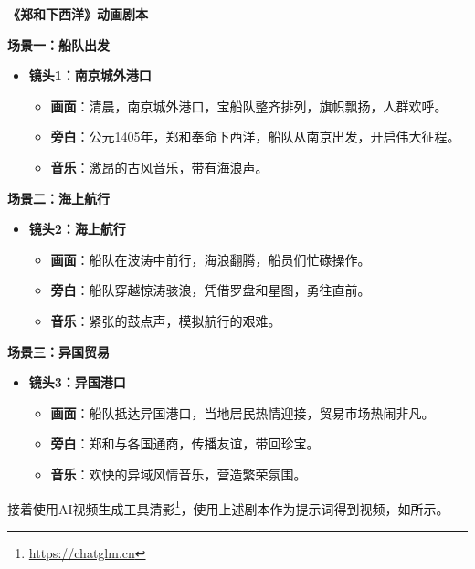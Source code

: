 \begin{gptbox}
\small{
  \textbf{《郑和下西洋》动画剧本}

  \textbf{场景一：船队出发}
  \begin{itemize}
      \item \textbf{镜头1：南京城外港口}
      \begin{itemize}
          \item \textbf{画面}：清晨，南京城外港口，宝船队整齐排列，旗帜飘扬，人群欢呼。
          \item \textbf{旁白}：公元1405年，郑和奉命下西洋，船队从南京出发，开启伟大征程。
          \item \textbf{音乐}：激昂的古风音乐，带有海浪声。
      \end{itemize}
  \end{itemize}
  
  \textbf{场景二：海上航行}
  \begin{itemize}
      \item \textbf{镜头2：海上航行}
      \begin{itemize}
          \item \textbf{画面}：船队在波涛中前行，海浪翻腾，船员们忙碌操作。
          \item \textbf{旁白}：船队穿越惊涛骇浪，凭借罗盘和星图，勇往直前。
          \item \textbf{音乐}：紧张的鼓点声，模拟航行的艰难。
      \end{itemize}
  \end{itemize}
  
  \textbf{场景三：异国贸易}
  \begin{itemize}
      \item \textbf{镜头3：异国港口}
      \begin{itemize}
          \item \textbf{画面}：船队抵达异国港口，当地居民热情迎接，贸易市场热闹非凡。
          \item \textbf{旁白}：郑和与各国通商，传播友谊，带回珍宝。
          \item \textbf{音乐}：欢快的异域风情音乐，营造繁荣氛围。
      \end{itemize}
  \end{itemize}

}
\end{gptbox}


接着使用AI视频生成工具清影\footnote{\url{https://chatglm.cn}}，使用上述剧本作为提示词得到视频，如所示。

